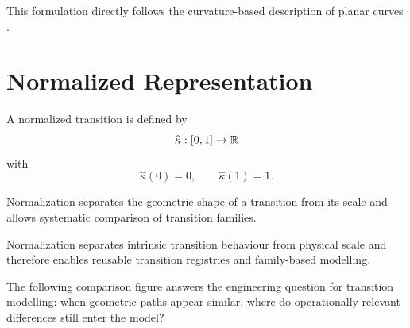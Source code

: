 This formulation directly follows the curvature-based description of
planar curves \cite{DoCarmo1976Curves}.

\section{Normalized Representation}

\begin{definition}
A normalized transition is defined by
\[
\widehat{\kappa} : [0,1] \to \mathbb{R}
\]
with
\[
\widehat{\kappa}(0)=0,
\qquad
\widehat{\kappa}(1)=1.
\]
\end{definition}

Normalization separates the geometric shape of a transition from its
scale and allows systematic comparison of transition families.

Normalization separates intrinsic transition behaviour from physical
scale and therefore enables reusable transition registries and
family-based modelling.

The following comparison figure answers the engineering question for
transition modelling: when geometric paths appear similar, where do
operationally relevant differences still enter the model?


